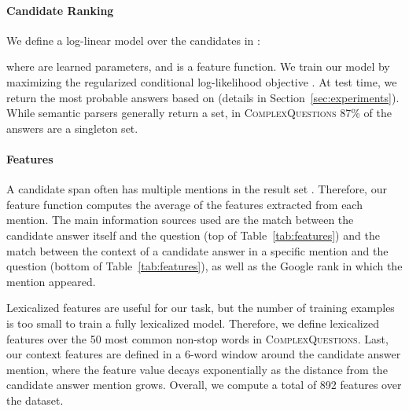 \documentclass[11pt,a4paper]{article}
\begin{document}
\paragraph{Candidate Ranking}

We define a log-linear model over the candidates in :

where  are learned parameters, and  is a feature function. We train our model by maximizing the regularized conditional log-likelihood objective . 
At test time, we return the most probable answers based on  (details in Section~\ref{sec:experiments}). While semantic parsers generally return a set, in \textsc{ComplexQuestions} 87\% of the answers are a singleton set.

\paragraph{Features} A candidate span  often has multiple mentions in the result set . Therefore, our feature function  computes the average of the features extracted from each mention.
The main information sources used are the match between the candidate answer itself and the question (top of Table~\ref{tab:features}) and the match between the context of a candidate answer in a specific mention and the question (bottom of Table~\ref{tab:features}), as well as the Google rank in which the mention appeared.

Lexicalized features are useful for our task, but the number of training examples is too small to train a fully lexicalized model. Therefore, we define lexicalized features over the 50 most common non-stop words in \textsc{ComplexQuestions}. Last, our context features are defined in a 6-word window around the candidate answer mention, where the feature value decays exponentially as the distance from the candidate answer mention grows.
Overall, we compute a total of 892 features over the dataset.
\end{document}
